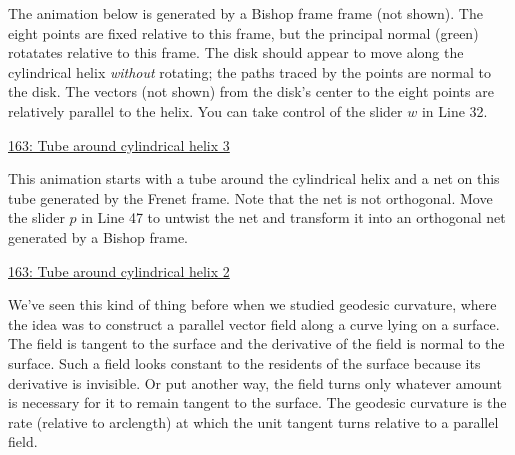 \documentclass{ximera}
\begin{document}
\begin{exploration}
The animation below is generated by a Bishop frame frame (not shown). The eight points are fixed relative to this frame, but the principal normal (green) rotatates relative to this frame. The disk should appear to move along the cylindrical helix \emph{without} rotating; the paths traced by the points are normal to the disk. The vectors (not shown) from the disk's center to the eight points are relatively parallel to the helix. You can take control of the slider $w$ in Line 32.

\begin{onlineOnly}
    \begin{center}
\end{center}
\end{onlineOnly}

\href{https://www.desmos.com/3d/fg6l58x6tl}{163: Tube around cylindrical helix 3}

\end{exploration}

\begin{exploration}
This animation starts with a tube around the cylindrical helix and a net on this tube generated by the Frenet frame. Note that the net is not orthogonal. Move the slider $p$ in Line 47 to untwist the net and transform it into an orthogonal net generated by a Bishop frame.

\begin{onlineOnly}
    \begin{center}
\end{center}
\end{onlineOnly}

\href{https://www.desmos.com/3d/agzievbron}{163: Tube around cylindrical helix 2}
\end{exploration}

We've seen this kind of thing before when we studied geodesic curvature, where the idea was to construct a parallel vector field along a curve lying on a surface. The field is tangent to the surface and the derivative of the field is normal to the surface. Such a field looks constant to the residents of the surface because its derivative is invisible. Or put another way, the field turns only whatever amount is necessary for it to remain tangent to the surface. The geodesic curvature is the rate (relative to arclength) at which the unit tangent turns relative to a parallel field.
\end{document}
